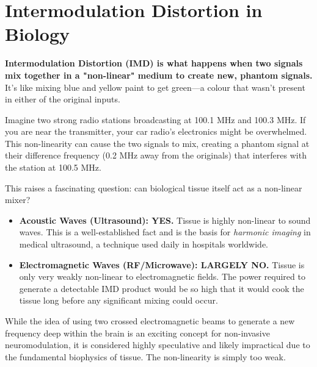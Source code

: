 
\chapter{Intermodulation Distortion in Biology}
\label{ch:imd-biology}

\begin{nontechnical}
    \textbf{Intermodulation Distortion (IMD) is what happens when two signals mix together in a "non-linear" medium to create new, phantom signals.} It's like mixing blue and yellow paint to get green—a colour that wasn't present in either of the original inputs.

    Imagine two strong radio stations broadcasting at 100.1 MHz and 100.3 MHz. If you are near the transmitter, your car radio's electronics might be overwhelmed. This non-linearity can cause the two signals to mix, creating a phantom signal at their difference frequency (0.2 MHz away from the originals) that interferes with the station at 100.5 MHz.

    This raises a fascinating question: can biological tissue itself act as a non-linear mixer?
    \begin{itemize}
        \item \textbf{Acoustic Waves (Ultrasound): YES.} Tissue is highly non-linear to sound waves. This is a well-established fact and is the basis for \emph{harmonic imaging} in medical ultrasound, a technique used daily in hospitals worldwide.
        \item \textbf{Electromagnetic Waves (RF/Microwave): LARGELY NO.} Tissue is only very weakly non-linear to electromagnetic fields. The power required to generate a detectable IMD product would be so high that it would cook the tissue long before any significant mixing could occur.
    \end{itemize}

    While the idea of using two crossed electromagnetic beams to generate a new frequency deep within the brain is an exciting concept for non-invasive neuromodulation, it is considered highly speculative and likely impractical due to the fundamental biophysics of tissue. The non-linearity is simply too weak.
\end{nontechnical}


